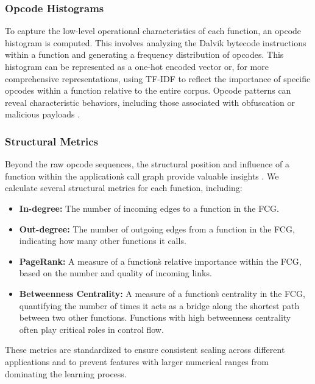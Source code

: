 \documentclass[runningheads]{llncs}
\begin{document}
\subsubsection{Opcode Histograms}
To capture the low-level operational characteristics of each function, an opcode histogram is computed. This involves analyzing the Dalvik bytecode instructions within a function and generating a frequency distribution of opcodes. This histogram can be represented as a one-hot encoded vector or, for more comprehensive representations, using TF-IDF to reflect the importance of specific opcodes within a function relative to the entire corpus. Opcode patterns can reveal characteristic behaviors, including those associated with obfuscation or malicious payloads \cite{kang2016n,niu2020opcode}.

\subsubsection{Structural Metrics}
Beyond the raw opcode sequences, the structural position and influence of a function within the application\`s call graph provide valuable insights \cite{cui2022positional,freeman1977set}. We calculate several structural metrics for each function, including:
\begin{itemize}
    \item \textbf{In-degree:} The number of incoming edges to a function in the FCG.
    \item \textbf{Out-degree:} The number of outgoing edges from a function in the FCG, indicating how many other functions it calls.
    \item \textbf{PageRank:} A measure of a function\`s relative importance within the FCG, based on the number and quality of incoming links.
    \item \textbf{Betweenness Centrality:} A measure of a function\`s centrality in the FCG, quantifying the number of times it acts as a bridge along the shortest path between two other functions. Functions with high betweenness centrality often play critical roles in control flow.
\end{itemize}
These metrics are standardized to ensure consistent scaling across different applications and to prevent features with larger numerical ranges from dominating the learning process.
\end{document}
